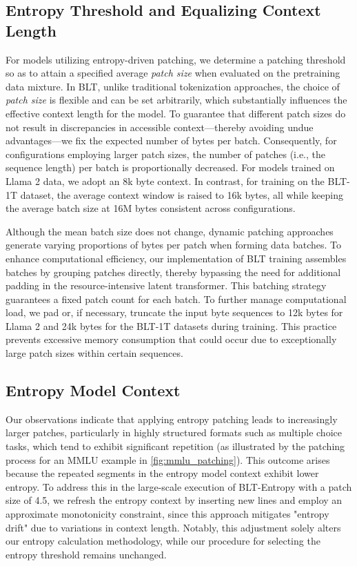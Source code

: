 \subsection{Entropy Threshold and Equalizing Context Length} For models utilizing entropy-driven patching, we determine a patching threshold so as to attain a specified average \textit{patch size} when evaluated on the pretraining data mixture. In {\textsc BLT}, unlike traditional tokenization approaches, the choice of \textit{patch size} is flexible and can be set arbitrarily, which substantially influences the effective context length for the model. To guarantee that different patch sizes do not result in discrepancies in accessible context—thereby avoiding undue advantages—we fix the expected number of bytes per batch. Consequently, for configurations employing larger patch sizes, the number of patches (i.e., the sequence length) per batch is proportionally decreased. For models trained on Llama 2 data, we adopt an 8k byte context. In contrast, for training on the {\textsc BLT}-1T dataset, the average context window is raised to 16k bytes, all while keeping the average batch size at 16M bytes consistent across configurations.

Although the mean batch size does not change, dynamic patching approaches generate varying proportions of bytes per patch when forming data batches. To enhance computational efficiency, our implementation of {\textsc BLT} training assembles batches by grouping patches directly, thereby bypassing the need for additional padding in the resource-intensive latent transformer. This batching strategy guarantees a fixed patch count for each batch. To further manage computational load, we pad or, if necessary, truncate the input byte sequences to 12k bytes for Llama 2 and 24k bytes for the {\textsc BLT}-1T datasets during training. This practice prevents excessive memory consumption that could occur due to exceptionally large patch sizes within certain sequences.

\subsection{Entropy Model Context}
\label{section:entropy-context}
Our observations indicate that applying entropy patching leads to increasingly larger patches, particularly in highly structured formats such as multiple choice tasks, which tend to exhibit significant repetition (as illustrated by the patching process for an MMLU example in \autoref{fig:mmlu_patching}). This outcome arises because the repeated segments in the entropy model context exhibit lower entropy. To address this in the large-scale execution of {\textsc BLT}-Entropy with a patch size of 4.5, we refresh the entropy context by inserting new lines and employ an approximate monotonicity constraint, since this approach mitigates "entropy drift" due to variations in context length. Notably, this adjustment solely alters our entropy calculation methodology, while our procedure for selecting the entropy threshold remains unchanged.

